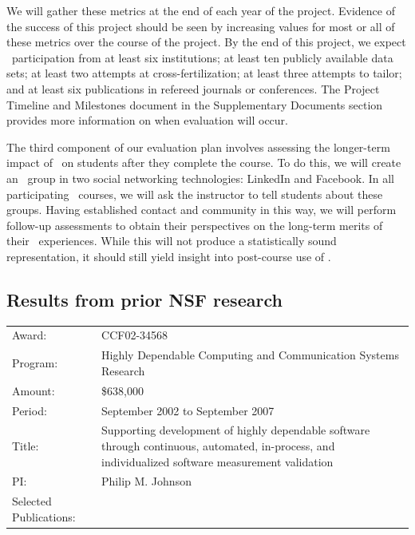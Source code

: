 We will gather these metrics at the end of each year of the project.
Evidence of the success of this project should be seen by increasing values
for most or all of these metrics over the course of the project.  By the
end of this project, we expect \eCT\ participation from at least six
institutions; at least ten publicly available data sets; at least two
attempts at cross-fertilization; at least three attempts to tailor; and at
least six publications in refereed journals or conferences.  The Project Timeline 
and Milestones document in the Supplementary Documents section provides more 
information on when evaluation will occur. 

The third component of our evaluation plan involves assessing the
longer-term impact of \eCT\ on students after they complete the course. To
do this, we will create an \eCT\ group in two social networking
technologies: LinkedIn and Facebook.  In all participating \eCT\ courses,
we will ask the instructor to tell students about these groups. Having established
contact and community in this way, we will perform follow-up assessments 
to obtain their perspectives on the long-term merits of their \eCT\ experiences. 
While this will not produce a statistically sound representation, it should still
yield insight into post-course use of \eCT.

\subsection{Results from prior NSF research}

\begin{tabular}{p{1in}p{5in}}

Award: & CCF02-34568 \\ 
Program: & Highly Dependable Computing and Communication Systems Research\\ 
Amount: & \$638,000 \\ 
Period: & September 2002 to September 2007 \\ 
Title: & Supporting development of highly dependable software through
continuous, automated, in-process, and individualized software measurement validation \\ 
PI: & Philip M. Johnson \\ 
Selected \newline Publications: & \cite{csdl2-04-22,csdl2-04-13,csdl2-04-11,csdl2-03-12,
csdl2-02-07,csdl2-03-07,csdl2-04-02,csdl2-04-04,csdl2-04-11,csdl2-06-07,csdl2-06-08,csdl2-06-13,csdl2-06-06}
\end{tabular} \\ %

